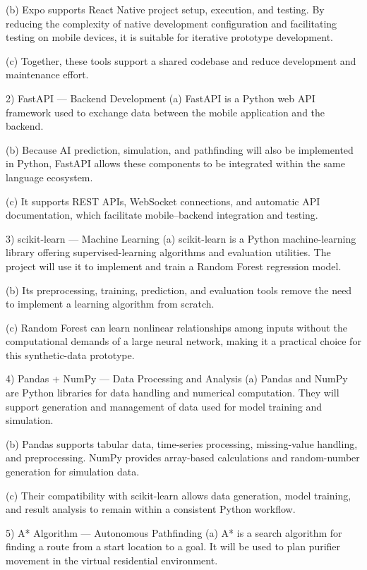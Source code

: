 (b) Expo supports React Native project setup, execution, and testing. By reducing the complexity of native development configuration and facilitating testing on mobile devices, it is suitable for iterative prototype development.

(c) Together, these tools support a shared codebase and reduce development and maintenance effort.

2) FastAPI — Backend Development
(a) FastAPI is a Python web API framework used to exchange data between the mobile application and the backend.

(b) Because AI prediction, simulation, and pathfinding will also be implemented in Python, FastAPI allows these components to be integrated within the same language ecosystem.

(c) It supports REST APIs, WebSocket connections, and automatic API documentation, which facilitate mobile–backend integration and testing.

3) scikit-learn — Machine Learning
(a) scikit-learn is a Python machine-learning library offering supervised-learning algorithms and evaluation utilities. The project will use it to implement and train a Random Forest regression model.

(b) Its preprocessing, training, prediction, and evaluation tools remove the need to implement a learning algorithm from scratch.

(c) Random Forest can learn nonlinear relationships among inputs without the computational demands of a large neural network, making it a practical choice for this synthetic-data prototype.

4) Pandas + NumPy — Data Processing and Analysis
(a) Pandas and NumPy are Python libraries for data handling and numerical computation. They will support generation and management of data used for model training and simulation.

(b) Pandas supports tabular data, time-series processing, missing-value handling, and preprocessing. NumPy provides array-based calculations and random-number generation for simulation data.

(c) Their compatibility with scikit-learn allows data generation, model training, and result analysis to remain within a consistent Python workflow.

5) A* Algorithm — Autonomous Pathfinding
(a) A* is a search algorithm for finding a route from a start location to a goal. It will be used to plan purifier movement in the virtual residential environment.

